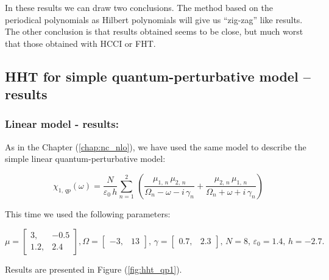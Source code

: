 \documentclass[12pt,twoside,a4paper]{article}
\numberwithin{equation}{subsection}
\numberwithin{figure}{subsection}
\begin{document}
In these results we can draw two conclusions. The method based on the periodical polynomials as Hilbert polynomials will give us ``zig-zag'' like results. The other conclusion is that results obtained seems to be close, but much worst that those obtained with HCCI or FHT. 

\subsection{HHT for simple quantum-perturbative model -- results} \label{chap:hermite_quantum}

\subsubsection*{Linear model - results:}

As in the Chapter (\ref{chap:nc_nlo}), we have used the same model to describe the simple linear quantum-perturbative model: 

\begin{equation} \label{eq:hht_qp}
  {\chi_{1, \,qp}}(\omega ) = \frac {N}{\varepsilon_0\,h} \sum_{n=1}^{2}\,(\frac {{\mu_{1, \,n}}\,{ \mu_{2, \,n}}}{{\Omega_{n}}
  - \omega  - i\,{\gamma_{n}}} + \frac {{\mu_{2, \,n}}\,{\mu_{1, \,n}}}{{\Omega_{n}} + \omega + i\,{\gamma_{n}}})
\end{equation}

This time we used the following parameters: 

\begin{equation}
  \mu = \begin{bmatrix} 
    3,   & - 0.5 \\ 
    1.2, &   2.4
  \end{bmatrix},
  \Omega = \begin{bmatrix} 
    - 3, & 13
  \end{bmatrix}, \,
  \gamma = \begin{bmatrix} 
    0.7, & 2.3
  \end{bmatrix}, \,
  N = 8, \,
  \varepsilon_{0} = 1.4, \,
  h = - 2.7.
\end{equation} 

Results are presented in Figure (\ref{fig:hht_qp1}). 
\end{document}
